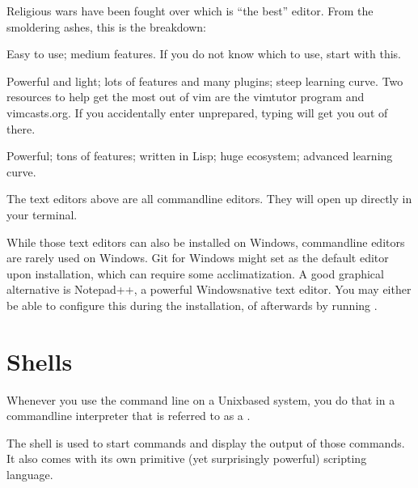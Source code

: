 \sphinxAtStartPar
Religious wars have been fought over which is “the best” editor. From the smoldering ashes,
this is the breakdown:
\begin{description}
\sphinxAtStartPar
Easy to use; medium features. If you do not know which to use, start with this.

\sphinxAtStartPar
Powerful and light; lots of features and many plugins; steep learning curve.
Two resources to help get the most out of vim are the vimtutor program
and vimcasts.org. If you accidentally enter  unprepared, typing 
will get you out of there.

\sphinxAtStartPar
Powerful; tons of features; written in Lisp; huge ecosystem; advanced learning curve.

\end{description}

\sphinxAtStartPar
The text editors above are all command\sphinxhyphen{}line editors.
They will open up directly in your terminal.

\ignorespaces 
\sphinxAtStartPar
While those text editors can also be installed on Windows, command\sphinxhyphen{}line editors are rarely used on Windows.
Git for Windows might set {\hyperref[\detokenize{glossary:term-vim}]{}} as the default editor upon installation, which can require some acclimatization.
A good graphical alternative is Notepad++, a powerful Windows\sphinxhyphen{}native text editor.
You may either be able to configure this during the installation, of afterwards by running .


\section{Shells}
\label{\detokenize{intro/howto:shells}}
\sphinxAtStartPar
Whenever you use the command line on a Unix\sphinxhyphen{}based system, you do that in a command\sphinxhyphen{}line
interpreter that is referred to as a .

\sphinxAtStartPar
The shell is used to start commands and display the output of those commands.
It also comes with its own primitive (yet surprisingly powerful) scripting language.

